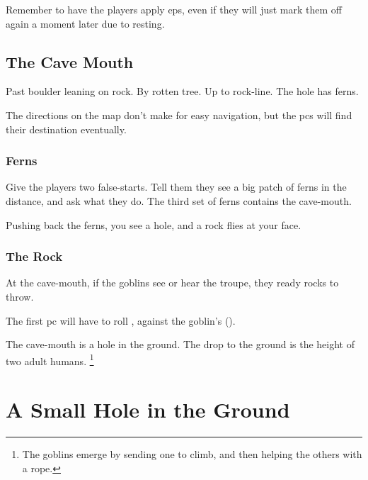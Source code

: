 \begin{multicols}{2}
Remember to have the players apply \glspl{ep}, even if they will just mark them off again a moment later due to resting.

\subsection{The Cave Mouth}

\begin{exampletext}
  Past boulder leaning on rock.
  By rotten tree.
  Up to rock-line.
  The hole has ferns.
\end{exampletext}

The directions on the map don't make for easy navigation, but the \glspl{pc} will find their destination eventually.

\subsubsection{Ferns}
Give the players two false-starts.
Tell them they see a big patch of ferns in the distance, and ask what they do.
The third set of ferns contains the cave-mouth.

\begin{boxtext}
  Pushing back the ferns, you see a hole, and a rock flies at your face.
\end{boxtext}

\subsubsection{The Rock}
At the cave-mouth, if the goblins see or hear the troupe, they ready rocks to throw.


The first \gls{pc} will have to roll , against the goblin's  (\tn).

The cave-mouth is a hole in the ground.
The drop to the ground is the height of two adult humans.%
\footnote{The goblins emerge by sending one to climb, and then helping the others with a rope.}

\end{multicols}

\needspace{15em}
\section{A Small Hole in the Ground}

